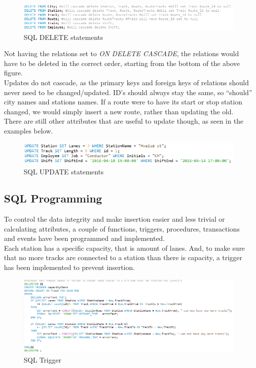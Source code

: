 \begin{figure}[ht!]
    \centering
    \includegraphics[width=1\textwidth]{img/DELETE_Statements}
    \caption{SQL DELETE statements}
\end{figure}

Not having the relations set to \emph{ON DELETE CASCADE}, the relations would have to be deleted in the correct order, starting from the bottom of the above figure.
\\[12pt]
Updates do not cascade, as the primary keys and foreign keys of relations 
should never need to be changed/updated. ID's should always stay the same, so 
``should'' city names and stations names. If a route were to have its start or 
stop station changed, we would simply insert a new route, rather than updating 
the old.\\
There are still other attributes that are useful to update though, as seen in the examples below.

\begin{figure}[ht!]
    \centering
    \includegraphics[width=1\textwidth]{img/UPDATE_Statements}
    \caption{SQL UPDATE statements}
\end{figure}
\newpage

\subsection{SQL Programming}
To control the data integrity and make insertion easier and less trivial or calculating attributes, a couple of functions, triggers, procedures, transactions and events have been programmed and implemented.
\\[12pt]
Each station has a specific capacity, that is amount of lanes. And, to make sure that no more tracks are connected to a station than there is capacity, a trigger has been implemented to prevent insertion.

\begin{figure}[ht!]
    \centering
    \includegraphics[width=1\textwidth]{img/SQL_TRIGGER}
    \caption{SQL Trigger}
\end{figure}

